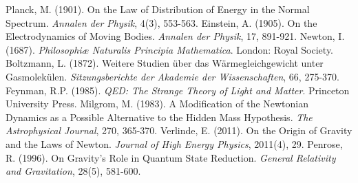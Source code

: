 \documentclass[12pt,a4paper]{article}
\begin{document}
\begin{thebibliography}{99}
		 Planck, M. (1901). On the Law of Distribution of Energy in the Normal Spectrum. \textit{Annalen der Physik}, 4(3), 553-563.
		 Einstein, A. (1905). On the Electrodynamics of Moving Bodies. \textit{Annalen der Physik}, 17, 891-921.
		 Newton, I. (1687). \textit{Philosophiæ Naturalis Principia Mathematica}. London: Royal Society.
		 Boltzmann, L. (1872). Weitere Studien über das Wärmegleichgewicht unter Gasmolekülen. \textit{Sitzungsberichte der Akademie der Wissenschaften}, 66, 275-370.
		 Feynman, R.P. (1985). \textit{QED: The Strange Theory of Light and Matter}. Princeton University Press.
		 Milgrom, M. (1983). A Modification of the Newtonian Dynamics as a Possible Alternative to the Hidden Mass Hypothesis. \textit{The Astrophysical Journal}, 270, 365-370.
		 Verlinde, E. (2011). On the Origin of Gravity and the Laws of Newton. \textit{Journal of High Energy Physics}, 2011(4), 29.
		 Penrose, R. (1996). On Gravity's Role in Quantum State Reduction. \textit{General Relativity and Gravitation}, 28(5), 581-600.
	\end{thebibliography}
	
\end{document}
